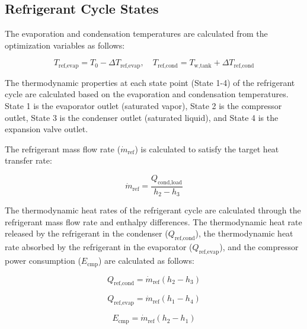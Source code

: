 \documentclass[letterpaper,10pt]{article}
\begin{document}
\subsection{Refrigerant Cycle States}

The evaporation and condensation temperatures are calculated from the optimization variables as follows:

\begin{equation}
\label{eq:hpb_temperatures}
T_{\text{ref,evap}} = T_0 - \Delta T_{\text{ref,evap}}, \quad T_{\text{ref,cond}} = T_{\text{w,tank}} + \Delta T_{\text{ref,cond}}
\end{equation}

The thermodynamic properties at each state point (State 1-4) of the refrigerant cycle are calculated based on the evaporation and condensation temperatures. State 1 is the evaporator outlet (saturated vapor), State 2 is the compressor outlet, State 3 is the condenser outlet (saturated liquid), and State 4 is the expansion valve outlet.

The refrigerant mass flow rate ($\dot{m}_{\text{ref}}$) is calculated to satisfy the target heat transfer rate:

\begin{equation}
\label{eq:hpb_refrigerant_flow}
\dot{m}_{\text{ref}} = \frac{Q_{\text{cond,load}}}{h_2 - h_3}
\end{equation}

The thermodynamic heat rates of the refrigerant cycle are calculated through the refrigerant mass flow rate and enthalpy differences. The thermodynamic heat rate released by the refrigerant in the condenser ($Q_{\text{ref,cond}}$), the thermodynamic heat rate absorbed by the refrigerant in the evaporator ($Q_{\text{ref,evap}}$), and the compressor power consumption ($E_{\text{cmp}}$) are calculated as follows:

\begin{equation}
\label{eq:hpb_q_ref_cond}
Q_{\text{ref,cond}} = \dot{m}_{\text{ref}} (h_2 - h_3)
\end{equation}

\begin{equation}
\label{eq:hpb_q_ref_evap}
Q_{\text{ref,evap}} = \dot{m}_{\text{ref}} (h_1 - h_4)
\end{equation}

\begin{equation}
\label{eq:hpb_e_cmp}
E_{\text{cmp}} = \dot{m}_{\text{ref}} (h_2 - h_1)
\end{equation}
\end{document}
